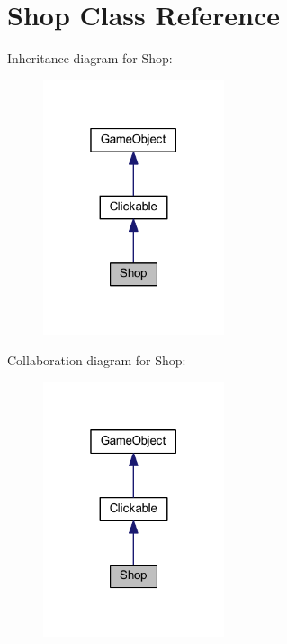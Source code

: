 \hypertarget{class_shop}{\section{Shop Class Reference}
\label{class_shop}
}


Inheritance diagram for Shop\+:\nopagebreak
\begin{figure}[H]
\begin{center}
\leavevmode
\includegraphics[width=151pt]{class_shop__inherit__graph}
\end{center}
\end{figure}


Collaboration diagram for Shop\+:\nopagebreak
\begin{figure}[H]
\begin{center}
\leavevmode
\includegraphics[width=151pt]{class_shop__coll__graph}
\end{center}
\end{figure}
